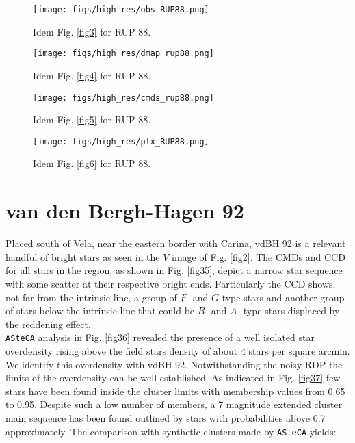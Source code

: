 \documentclass{aa}
\begin{document}
\begin{figure*}[ht]
    \centering
    \texttt{[image: figs/high\_res/obs\_RUP88.png]}
    \caption{Idem Fig. \ref{fig3} for RUP 88.}
    \label{fig31}
\end{figure*}
\begin{figure*}[ht]
    \centering
    \texttt{[image: figs/high\_res/dmap\_rup88.png]}
    \caption{Idem Fig. \ref{fig4} for RUP 88.}
    \label{fig32}
\end{figure*}
\begin{figure*}[ht]
    \centering
    \texttt{[image: figs/high\_res/cmds\_rup88.png]}
    \caption{Idem Fig. \ref{fig5} for RUP 88.}
    \label{fig33}
\end{figure*}
\begin{figure*}[ht]
    \centering
    \texttt{[image: figs/high\_res/plx\_RUP88.png]}
    \caption{Idem Fig. \ref{fig6} for RUP 88.}
    \label{fig34}
\end{figure*}




\section{van den Bergh-Hagen 92}

Placed south of Vela, near the eastern border with Carina, vdBH
92 is a relevant handful of bright stars as seen in the $V$ image of Fig.
\ref{fig2}. The CMDs and CCD for all stars in the region, as shown in Fig.
\ref{fig35}, depict a narrow star sequence with some scatter at their respective
bright ends. Particularly the CCD shows, not far from the intrinsic line, a
group of $F$- and $G$-type stars and another group of stars below the intrinsic
line that could be $B$- and $A$- type stars displaced by the reddening effect.\\

\texttt{ASteCA} analysis in Fig. \ref{fig36} revealed the presence of a well
isolated star overdensity rising above the field stars density of about 4
stars per square arcmin. We identify this overdensity with vdBH
92. Notwithstanding the noisy RDP the limits of the overdensity can be well
established. As indicated in Fig. \ref{fig37} few stars have been found inside
the cluster limits with membership values from 0.65 to 0.95. Despite such a low
number of members, a 7 magnitude extended cluster main sequence has been found
outlined by stars with probabilities above 0.7 approximately. The comparison
with synthetic clusters made by \texttt{ASteCA} yields:
\end{document}
